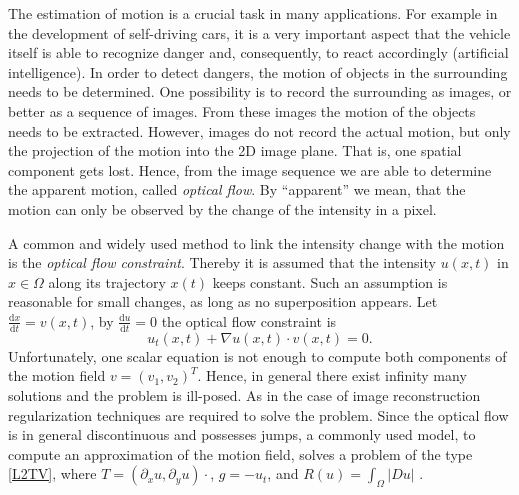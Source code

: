 \documentclass[enabledeprecatedfontcommands,cleardoublepage=empty,headsepline,twoside,11pt,DIV=15,BCOR=12mm,final]{scrartcl}
\begin{document}
The estimation of motion is a crucial task in many applications. For example in the development of self-driving cars, it is a very important aspect that the vehicle itself is able to recognize danger and, consequently,  to react accordingly (artificial intelligence). In order to detect dangers, the motion of objects in the surrounding needs to be determined. One possibility is to record the surrounding as images, or better as a sequence of images. From these images the motion of the objects needs to be extracted. However, images do not record the actual motion, but only the projection of the motion into the 2D image plane. That is, one spatial component gets lost. Hence, from the image sequence we are able to determine the apparent motion, called \emph{optical flow}. By ``apparent'' we mean, that the motion can only be observed by the change of the intensity in a pixel. 

A common and widely used method to link the intensity change with the motion is the \emph{optical flow constraint}. Thereby it is assumed that the intensity $u(x,t)$ in $x\in \Omega$ along its trajectory $x(t)$ keeps constant. Such an assumption is reasonable for small changes, as long as no superposition appears. Let $\frac{\text{d}x}{\text{d}t}=v(x,t)$, by $\frac{\text{d}u}{\text{d}t}=0$ the optical flow constraint is
\begin{equation}\label{Eq:OFC}
u_t(x,t) + \nabla u(x,t) \cdot v(x,t) = 0.
\end{equation}
Unfortunately, one scalar equation is not enough to compute both components of the motion field $v=(v_1,v_2)^T$. Hence, in general there exist infinity many solutions and the problem is ill-posed. As in the case of image reconstruction regularization techniques are required to solve the problem. Since the optical flow is in general discontinuous and possesses jumps, a commonly used model, to compute an approximation of the motion field, solves a problem of the type \eqref{L2TV}, where $T=(\partial_x u, \partial_y u)\cdot $, $g=-u_t$, and $R(u)=\int_\Omega |Du|$ \cite{AubDerKorn1999,AubKor}.
\end{document}

